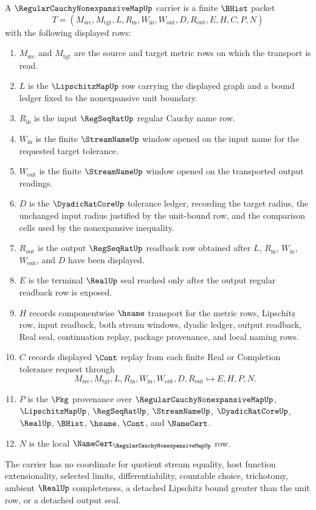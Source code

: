 \begin{definition}
\label{def:regular-cauchy-nonexpansive-map-carrier}
A $\RegularCauchyNonexpansiveMapUp$ carrier is a finite $\BHist$ packet
$$
T=(M_{\mathrm{src}},M_{\mathrm{tgt}},L,R_{\mathrm{in}},W_{\mathrm{in}},W_{\mathrm{out}},D,R_{\mathrm{out}},E,H,C,P,N)
$$
with the following displayed rows:
\begin{enumerate}
\item $M_{\mathrm{src}}$ and $M_{\mathrm{tgt}}$ are the source and target metric rows on which the transport is read.
\item $L$ is the $\LipschitzMapUp$ row carrying the displayed graph and a bound ledger fixed to the nonexpansive unit boundary.
\item $R_{\mathrm{in}}$ is the input $\RegSeqRatUp$ regular Cauchy name row.
\item $W_{\mathrm{in}}$ is the finite $\StreamNameUp$ window opened on the input name for the requested target tolerance.
\item $W_{\mathrm{out}}$ is the finite $\StreamNameUp$ window opened on the transported output readings.
\item $D$ is the $\DyadicRatCoreUp$ tolerance ledger, recording the target radius, the unchanged input radius justified by the unit-bound row, and the comparison cells used by the nonexpansive inequality.
\item $R_{\mathrm{out}}$ is the output $\RegSeqRatUp$ readback row obtained after $L$, $R_{\mathrm{in}}$, $W_{\mathrm{in}}$, $W_{\mathrm{out}}$, and $D$ have been displayed.
\item $E$ is the terminal $\RealUp$ seal reached only after the output regular readback row is exposed.
\item $H$ records componentwise $\hsame$ transport for the metric rows, Lipschitz row, input readback, both stream windows, dyadic ledger, output readback, Real seal, continuation replay, package provenance, and local naming rows.
\item $C$ records displayed $\Cont$ replay from each finite Real or Completion tolerance request through
$$
M_{\mathrm{src}},M_{\mathrm{tgt}},L,R_{\mathrm{in}},W_{\mathrm{in}},W_{\mathrm{out}},D,R_{\mathrm{out}} \longmapsto E,H,P,N .
$$
\item $P$ is the $\Pkg$ provenance over $\RegularCauchyNonexpansiveMapUp$, $\LipschitzMapUp$, $\RegSeqRatUp$, $\StreamNameUp$, $\DyadicRatCoreUp$, $\RealUp$, $\BHist$, $\hsame$, $\Cont$, and $\NameCert$.
\item $N$ is the local $\NameCert_{\RegularCauchyNonexpansiveMapUp}$ row.
\end{enumerate}
The carrier has no coordinate for quotient stream equality, host function extensionality, selected limits, differentiability, countable choice, trichotomy, ambient $\RealUp$ completeness, a detached Lipschitz bound greater than the unit row, or a detached output seal.
\end{definition}

